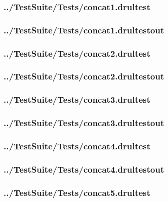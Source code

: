 \begin{changemargin}{-1in}{-1in}
\subsubsection{../TestSuite/Tests/concat1.drultest}


\subsubsection{../TestSuite/Tests/concat1.drultestout}


\subsubsection{../TestSuite/Tests/concat2.drultest}


\subsubsection{../TestSuite/Tests/concat2.drultestout}


\subsubsection{../TestSuite/Tests/concat3.drultest}


\subsubsection{../TestSuite/Tests/concat3.drultestout}


\subsubsection{../TestSuite/Tests/concat4.drultest}


\subsubsection{../TestSuite/Tests/concat4.drultestout}


\subsubsection{../TestSuite/Tests/concat5.drultest}



\end{changemargin}

